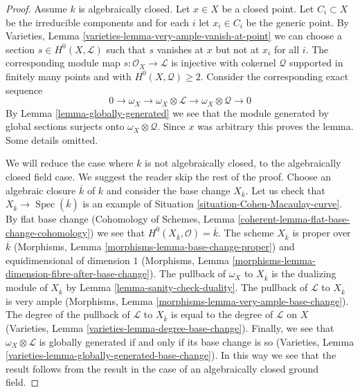 \documentclass{stacks-project}
\theoremstyle{plain}
\theoremstyle{definition}
\theoremstyle{remark}
\numberwithin{equation}{subsection}
\def\Spec{\mathop{\mathrm{Spec}}}
\begin{document}
\begin{proof}
Assume $k$ is algebraically closed. Let $x \in X$ be a closed point.
Let $C_i \subset X$ be the irreducible components and for each $i$
let $x_i \in C_i$ be the generic point. By
Varieties, Lemma \ref{varieties-lemma-very-ample-vanish-at-point}
we can choose a section $s \in H^0(X, \mathcal{L})$ such that $s$
vanishes at $x$ but not at $x_i$ for all $i$. The corresponding
module map $s : \mathcal{O}_X \to \mathcal{L}$ is injective with
cokernel $\mathcal{Q}$ supported in finitely many points and
with $H^0(X, \mathcal{Q}) \geq 2$. Consider the corresponding
exact sequence
$$
0 \to \omega_X \to \omega_X \otimes \mathcal{L} \to
\omega_X \otimes \mathcal{Q} \to 0
$$
By Lemma \ref{lemma-globally-generated} we see that the module generated
by global sections surjects onto $\omega_X \otimes \mathcal{Q}$.
Since $x$ was arbitrary this proves the lemma. Some details omitted.

\medskip\noindent
We will reduce the case where $k$ is not algebraically closed, to
the algebraically closed field case. We suggest the reader skip
the rest of the proof. Choose an algebraic closure $\overline{k}$
of $k$ and consider the base change $X_{\overline{k}}$. Let us
check that $X_{\overline{k}} \to \Spec(\overline{k})$ is an example
of Situation \ref{situation-Cohen-Macaulay-curve}. By flat base change
(Cohomology of Schemes, Lemma \ref{coherent-lemma-flat-base-change-cohomology})
we see that $H^0(X_{\overline{k}}, \mathcal{O}) = \overline{k}$.
The scheme $X_{\overline{k}}$ is proper over $\overline{k}$ (Morphisms,
Lemma \ref{morphisms-lemma-base-change-proper}) and
equidimensional of dimension $1$
(Morphisms, Lemma \ref{morphisms-lemma-dimension-fibre-after-base-change}).
The pullback of $\omega_X$ to $X_{\overline{k}}$ is the dualizing
module of $X_{\overline{k}}$ by Lemma \ref{lemma-sanity-check-duality}.
The pullback of $\mathcal{L}$ to $X_{\overline{k}}$ is very ample
(Morphisms, Lemma \ref{morphisms-lemma-very-ample-base-change}).
The degree of the pullback of $\mathcal{L}$ to $X_{\overline{k}}$
is equal to the degree of $\mathcal{L}$ on $X$ (Varieties, Lemma
\ref{varieties-lemma-degree-base-change}). Finally, we see that
$\omega_X \otimes \mathcal{L}$ is globally generated if and only
if its base change is so
(Varieties, Lemma \ref{varieties-lemma-globally-generated-base-change}).
In this way we see that the result follows from the result in the
case of an algebraically closed ground field.
\end{proof}
\end{document}
